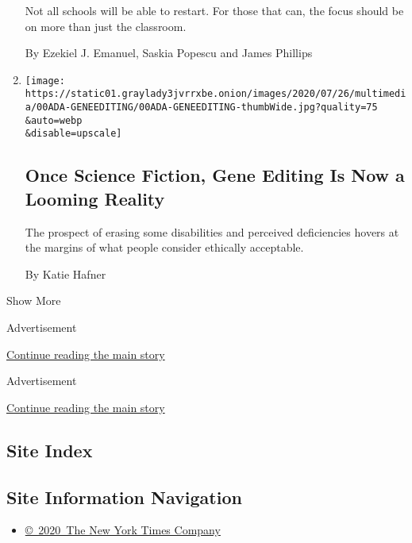 \begin{enumerate}
  Not all schools will be able to restart. For those that can, the focus
  should be on more than just the classroom.

  By Ezekiel J. Emanuel, Saskia Popescu and James Phillips
\item
  \href{/2020/07/22/style/crispr-gene-editing-ethics.html}{}

  \texttt{[image: https://static01.graylady3jvrrxbe.onion/images/2020/07/26/multimedia/00ADA-GENEEDITING/00ADA-GENEEDITING-thumbWide.jpg?quality=75\\\&auto=webp\\\&disable=upscale]}

  \hypertarget{once-science-fiction-gene-editing-is-now-a-looming-reality}{%
  \subsection{Once Science Fiction, Gene Editing Is Now a Looming
  Reality}\label{once-science-fiction-gene-editing-is-now-a-looming-reality}}

  The prospect of erasing some disabilities and perceived deficiencies
  hovers at the margins of what people consider ethically acceptable.

  By Katie Hafner
\end{enumerate}

Show More

Advertisement

\protect\hyperlink{after-mid2}{Continue reading the main story}

Advertisement

\protect\hyperlink{after-mktg}{Continue reading the main story}

\hypertarget{site-index}{%
\subsection{Site Index}\label{site-index}}

\hypertarget{site-information-navigation}{%
\subsection{Site Information
Navigation}\label{site-information-navigation}}

\begin{itemize}
\tightlist
\item
  \href{https://help.nytimes3xbfgragh.onion/hc/en-us/articles/115014792127-Copyright-notice}{©~2020~The
  New York Times Company}
\end{itemize}

